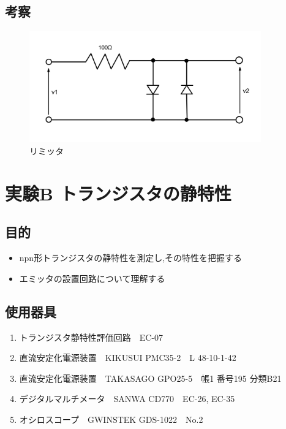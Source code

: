 \documentclass[titlepage]{jarticle}
\begin{document}
\subsection{考察}
\begin{figure}[H]
    \begin{center}
        \includegraphics[width=10cm]{image/limmit.jpg}
        \caption{リミッタ}
        \label{fig:リミッタ}
    \end{center}
\end{figure}


\newpage
\section{実験B トランジスタの静特性}
\subsection{目的}
\begin{itemize}
    \item npn形トランジスタの静特性を測定し,その特性を把握する
    \item エミッタの設置回路について理解する
\end{itemize}
\subsection{使用器具}
\begin{enumerate}
    \item トランジスタ静特性評価回路　EC-07
    \item 直流安定化電源装置　KIKUSUI PMC35-2　L 48-10-1-42
    \item 直流安定化電源装置　TAKASAGO GPO25-5　帳1 番号195 分類B21
    \item デジタルマルチメータ　SANWA CD770　EC-26, EC-35
    \item オシロスコープ　GWINSTEK GDS-1022　No.2
\end{enumerate}
\end{document}

